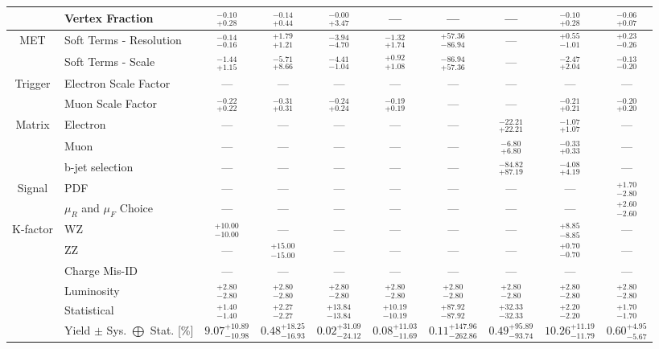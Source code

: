\begin{tabular}{|cl||cccccc|c||c|}
\cline{2-10}
&Vertex Fraction &  $^{-0.10}_{+0.28}$  &  $^{-0.14}_{+0.44}$  &  $^{-0.00}_{+3.47}$  & --- & --- & --- &  $^{-0.10}_{+0.28}$  &  $^{-0.06}_{+0.07}$ \\ 
\hline
\multirow{2}{*}{MET}
&Soft Terms - Resolution &  $^{-0.14}_{-0.16}$  &  $^{+1.79}_{+1.21}$  &  $^{-3.94}_{-4.70}$  &  $^{-1.32}_{+1.74}$  &  $^{+57.36}_{-86.94}$  & --- &  $^{+0.55}_{-1.01}$  &  $^{+0.23}_{-0.26}$ \\ 
\cline{2-10}
&Soft Terms - Scale &  $^{-1.44}_{+1.15}$  &  $^{-5.71}_{+8.66}$  &  $^{-4.41}_{-1.04}$  &  $^{+0.92}_{+1.08}$  &  $^{-86.94}_{+57.36}$  & --- &  $^{-2.47}_{+2.04}$  &  $^{-0.13}_{-0.20}$ \\ 
\hline
\multirow{2}{*}{Trigger}
&Electron Scale Factor & --- & --- & --- & --- & --- & --- & --- & ---\\ 
\cline{2-10}
&Muon Scale Factor &  $^{-0.22}_{+0.22}$  &  $^{-0.31}_{+0.31}$  &  $^{-0.24}_{+0.24}$  &  $^{-0.19}_{+0.19}$  & --- & --- &  $^{-0.21}_{+0.21}$  &  $^{-0.20}_{+0.20}$ \\ 
\hline
\multirow{2}{*}{Matrix}
&Electron & --- & --- & --- & --- & --- &  $^{-22.21}_{+22.21}$  &  $^{-1.07}_{+1.07}$  & ---\\ 
\cline{2-10}
\multirow{2}{*}{Method}
&Muon & --- & --- & --- & --- & --- &  $^{-6.80}_{+6.80}$  &  $^{-0.33}_{+0.33}$  & ---\\ 
\cline{2-10}
&b-jet selection & --- & --- & --- & --- & --- &  $^{-84.82}_{+87.19}$  &  $^{-4.08}_{+4.19}$  & ---\\ 
\hline
\multirow{2}{*}{Signal}
&PDF & --- & --- & --- & --- & --- & --- & --- &  $^{+1.70}_{-2.80}$ \\ 
\cline{2-10}
&$\mu_{R}$ and $\mu_{F}$ Choice & --- & --- & --- & --- & --- & --- & --- &  $^{+2.60}_{-2.60}$ \\ 
\hline
\multirow{2}{*}{K-factor}
&WZ &  $^{+10.00}_{-10.00}$  & --- & --- & --- & --- & --- &  $^{+8.85}_{-8.85}$  & ---\\ 
\cline{2-10}
&ZZ & --- &  $^{+15.00}_{-15.00}$  & --- & --- & --- & --- &  $^{+0.70}_{-0.70}$  & ---\\ 
\hline
&Charge Mis-ID & --- & --- & --- & --- & --- & --- & --- & ---\\ 
\hline
&Luminosity &  $^{+2.80}_{-2.80}$  &  $^{+2.80}_{-2.80}$  &  $^{+2.80}_{-2.80}$  &  $^{+2.80}_{-2.80}$  &  $^{+2.80}_{-2.80}$  &  $^{+2.80}_{-2.80}$  &  $^{+2.80}_{-2.80}$  &  $^{+2.80}_{-2.80}$ \\ 
\hline
&Statistical &  $^{+1.40}_{-1.40}$  &  $^{+2.27}_{-2.27}$  &  $^{+13.84}_{-13.84}$  &  $^{+10.19}_{-10.19}$  &  $^{+87.92}_{-87.92}$  &  $^{+32.33}_{-32.33}$  &  $^{+2.20}_{-2.20}$  &  $^{+1.70}_{-1.70}$ \\ 
\hline
\hline
&Yield $\pm$ Sys. $\bigoplus$ Stat. [\%] &  $9.07^{+10.89}_{-10.98}$  &  $0.48^{+18.25}_{-16.93}$  &  $0.02^{+31.09}_{-24.12}$  &  $0.08^{+11.03}_{-11.69}$  &  $0.11^{+147.96}_{-262.86}$  &  $0.49^{+95.89}_{-93.74}$  &  $10.26^{+11.19}_{-11.79}$  &  $0.60^{+4.95}_{-5.67}$ \\ 
\hline
\end{tabular}

